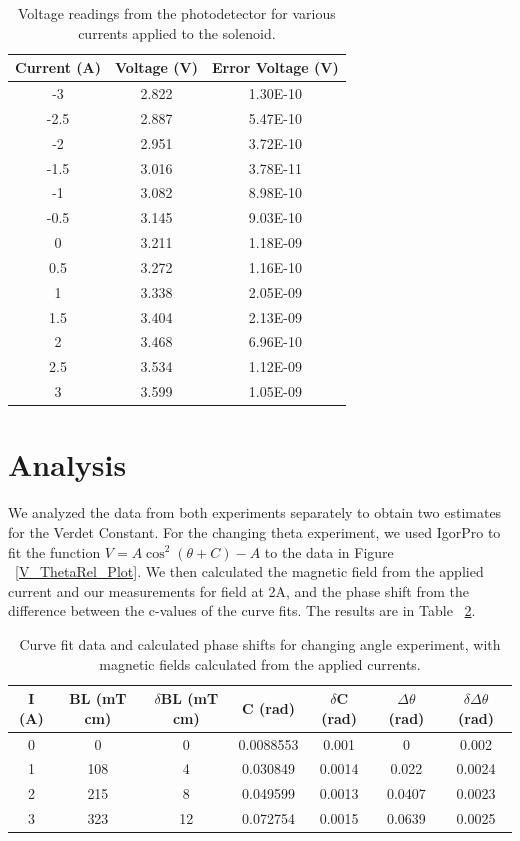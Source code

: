 \documentclass[prb,preprint]{revtex4-1}
\begin{document}
\begin{table}[h!]
\centering
\caption{Voltage readings from the photodetector for various currents applied to the solenoid. }
\begin{ruledtabular}
\begin{tabular}{c c c}
Current (A) & Voltage (V) & Error Voltage (V)\\
\hline	%
-3   & 2.822 & 1.30E-10 \\
-2.5 & 2.887 & 5.47E-10 \\
-2   & 2.951 & 3.72E-10 \\
-1.5 & 3.016 & 3.78E-11 \\
-1   & 3.082 & 8.98E-10 \\
-0.5 & 3.145 & 9.03E-10 \\
0    & 3.211 & 1.18E-09 \\
0.5  & 3.272 & 1.16E-10 \\
1    & 3.338 & 2.05E-09 \\
1.5  & 3.404 & 2.13E-09 \\
2    & 3.468 & 6.96E-10 \\
2.5  & 3.534 & 1.12E-09 \\
3    & 3.599 & 1.05E-09
\end{tabular}
\end{ruledtabular}
\label{V_I_Table}
\end{table}

\section{Analysis}

We analyzed the data from both experiments separately to obtain two estimates for the Verdet Constant.  For the changing theta experiment, we used IgorPro to fit the function $V = A \cos ^2 (\theta + C) - A$ to the data in Figure ~\ref{V_ThetaRel_Plot}.  We then calculated the magnetic field from the applied current and our measurements for field at 2A, and the phase shift from the difference between the c-values of the curve fits.  The results are in Table ~\ref{B*L_PhaseShift_Table}.  

\begin{table}[h!]
\centering
\caption{Curve fit data and calculated phase shifts for changing angle experiment, with magnetic fields calculated from the applied currents.}
\begin{ruledtabular}
\begin{tabular}{c c c c c c c}
I (A) & BL (mT cm) & $\delta$BL (mT cm) & C (rad)& $\delta$C (rad) & $\Delta \theta$ (rad) & $\delta \Delta \theta$ (rad)\\
\hline	%
0 &  0  & 0 &  0.0088553 & 0.001 & 0 & 0.002    \\
1 & 108 & 4  & 0.030849  & 0.0014 & 0.022  & 0.0024 \\
2 & 215 & 8 & 0.049599  & 0.0013 & 0.0407 & 0.0023  \\
3 & 323 & 12 & 0.072754  & 0.0015 & 0.0639 & 0.0025 
\end{tabular}
\end{ruledtabular}
\label{B*L_PhaseShift_Table}
\end{table}
\end{document}
